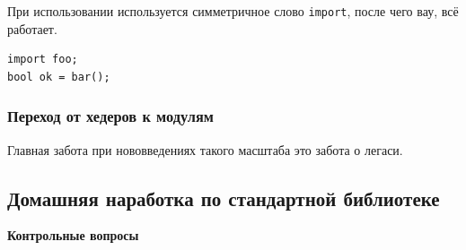 \documentclass[a4paper,12pt,oneside]{article}
\begin{document}
При использовании используется симметричное слово \lstinline!import!, после чего вау, всё работает.

\begin{lstlisting}
import foo;
bool ok = bar(); 
\end{lstlisting}

\subsubsection{Переход от хедеров к модулям}

Главная забота при нововведениях такого масштаба это забота о легаси.

\pagebreak
\subsection{Домашняя наработка по стандартной библиотеке}

\textbf{Контрольные вопросы}
\end{document}
